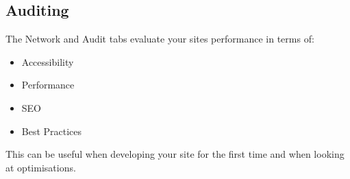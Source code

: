\subsection{Auditing}

The Network and Audit tabs evaluate your sites performance in terms of: 
\\

\begin{itemize}
    \item Accessibility
    \item Performance
    \item SEO
    \item Best Practices
\end{itemize}

This can be useful when developing your site for the first time and when looking at optimisations.
\\